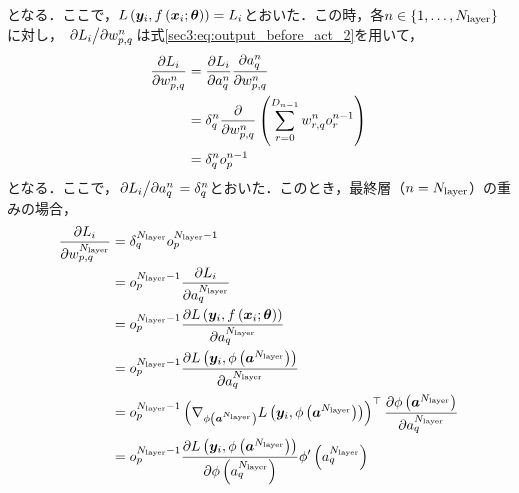 となる．ここで，$L\left(\bm{y}_{i}, f\left(\bm{x}_{i}; \bm{\theta}\right)\right) = L_{i}$とおいた．この時，各$n \in \left\{1, \ldots, N_{\text{layer}}\right\}$に対し，
$\pdv*{L_{i}}{w_{p, q}^{n}}$は式\eqref{sec3:eq:output_before_act_2}を用いて，
\begin{align}
    \pdv{L_{i}}{w_{p, q}^{n}} & = \pdv{L_{i}}{a_{q}^{n}} \pdv{a_{q}^{n}}{w_{p, q}^{n}}                \\
                                                     & = \delta_{q}^{n} \pdv{w_{p, q}^{n}} \left(\sum_{r = 0}^{D_{n - 1}} w_{r, q}^{n} o_{r}^{n - 1}\right) \\
                                                     & = \delta_{q}^{n} o_{p}^{n - 1}
\end{align}
となる．ここで，$\pdv*{L_{i}}{a_{q}^{n}} = \delta_{q}^{n}$とおいた．このとき，最終層（$n = N_{\text{layer}}$）の重みの場合，
\begin{align}
    \pdv{L_{i}}{w_{p, q}^{N_{\text{layer}}}} & = \delta_{q}^{N_{\text{layer}}} o_{p}^{N_{\text{layer}} - 1}                                                                                                                                                                                                           \\
                                                               & = o_{p}^{N_{\text{layer}} - 1} \pdv{L_{i}}{a_{q}^{N_{\text{layer}}}}                                                                                                                                                                                                   \\
                                                               & = o_{p}^{N_{\text{layer}} - 1} \pdv{L\left(\bm{y}_{i}, f\left(\bm{x}_{i}; \bm{\theta}\right)\right)}{a_{q}^{N_{\text{layer}}}}                                                                                           \\
                                                               & = o_{p}^{N_{\text{layer}} - 1} \pdv{L\left(\bm{y}_{i}, \phi\left(\bm{a}^{N_{\text{layer}}}\right)\right)}{a_{q}^{N_{\text{layer}}}}                                                                                                          \\
                                                               & = o_{p}^{N_{\text{layer}} - 1} \left(\nabla_{\phi\left(\bm{a}^{N_{\text{layer}}}\right)} L\left(\bm{y}_{i}, \phi\left(\bm{a}^{N_{\text{layer}}}\right)\right)\right)^\top \pdv{\phi\left(\bm{a}^{N_{\text{layer}}}\right)}{a_{q}^{N_{\text{layer}}}} \\
                                                               & = o_{p}^{N_{\text{layer}} - 1} \pdv{L\left(\bm{y}_{i}, \phi\left(\bm{a}^{N_{\text{layer}}}\right)\right)}{\phi\left(a_{q}^{N_{\text{layer}}}\right)} \phi'\left(a_{q}^{N_{\text{layer}}}\right)
\end{align}

